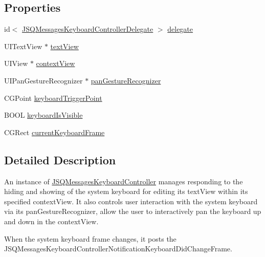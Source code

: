 \subsection*{Properties}
\begin{DoxyCompactItemize}
\item 
id$<$ \hyperlink{protocol_j_s_q_messages_keyboard_controller_delegate-p}{J\+S\+Q\+Messages\+Keyboard\+Controller\+Delegate} $>$ \hyperlink{interface_j_s_q_messages_keyboard_controller_ad0a23adc2f26a8243ded913b5ab905a4}{delegate}
\item 
U\+I\+Text\+View $\ast$ \hyperlink{interface_j_s_q_messages_keyboard_controller_a4053b7b2aafa792d2cceba5e3ccdf56d}{text\+View}
\item 
U\+I\+View $\ast$ \hyperlink{interface_j_s_q_messages_keyboard_controller_a9af5df9417b929671f7a8228054bd988}{context\+View}
\item 
U\+I\+Pan\+Gesture\+Recognizer $\ast$ \hyperlink{interface_j_s_q_messages_keyboard_controller_a017aa6ba932e9d0d3d4c521b416644a8}{pan\+Gesture\+Recognizer}
\item 
C\+G\+Point \hyperlink{interface_j_s_q_messages_keyboard_controller_a46912c3e769f2dd63aa2d714ad36c39c}{keyboard\+Trigger\+Point}
\item 
B\+O\+O\+L \hyperlink{interface_j_s_q_messages_keyboard_controller_abcd730af98f27ef8d6e9207200b7db74}{keyboard\+Is\+Visible}
\item 
C\+G\+Rect \hyperlink{interface_j_s_q_messages_keyboard_controller_a890ae9c5de10661967ddbc8070f95e9b}{current\+Keyboard\+Frame}
\end{DoxyCompactItemize}


\subsection{Detailed Description}
An instance of {\ttfamily \hyperlink{interface_j_s_q_messages_keyboard_controller}{J\+S\+Q\+Messages\+Keyboard\+Controller}} manages responding to the hiding and showing of the system keyboard for editing its {\ttfamily text\+View} within its specified {\ttfamily context\+View}. It also controls user interaction with the system keyboard via its {\ttfamily pan\+Gesture\+Recognizer}, allow the user to interactively pan the keyboard up and down in the {\ttfamily context\+View}.

When the system keyboard frame changes, it posts the {\ttfamily J\+S\+Q\+Messages\+Keyboard\+Controller\+Notification\+Keyboard\+Did\+Change\+Frame}. 

